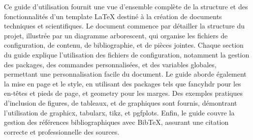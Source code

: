 Ce guide d'utilisation fournit une vue d'ensemble complète de la structure et des fonctionnalités d'un template LaTeX destiné à la création de documents techniques et scientifiques. Le document commence par détailler la structure du projet, illustrée par un diagramme arborescent, qui organise les fichiers de configuration, de contenu, de bibliographie, et de pièces jointes. Chaque section du guide explique l'utilisation des fichiers de configuration, notamment la gestion des packages, des commandes personnalisées, et des variables globales, permettant une personnalisation facile du document. Le guide aborde également la mise en page et le style, en utilisant des packages tels que fancyhdr pour les en-têtes et pieds de page, et geometry pour les marges. Des exemples pratiques d'inclusion de figures, de tableaux, et de graphiques sont fournis, démontrant l'utilisation de graphicx, tabularx, tikz, et pgfplots. Enfin, le guide couvre la gestion des références bibliographiques avec BibTeX, assurant une citation correcte et professionnelle des sources. 
